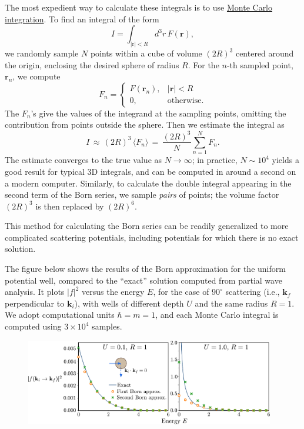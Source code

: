 \documentclass[pra,12pt]{revtex4}
\begin{document}
The most expedient way to calculate these integrals is to use
\href{https://en.wikipedia.org/wiki/Monte_Carlo_integration}{Monte
  Carlo integration}.  To find an integral of the form
\begin{equation}
  I = \int_{|\mathrm{r}|<R} d^3r \, F(\mathbf{r}),
\end{equation}
we randomly sample $N$ points within a cube of volume $(2R)^3$
centered around the origin, enclosing the desired sphere of radius
$R$.  For the $n$-th sampled point, $\mathbf{r}_n$, we compute
\begin{equation}
  F_n = \begin{cases}F(\mathbf{r}_n), & |\mathbf{r}| < R \\ 0, &\mathrm{otherwise}.\end{cases}
\end{equation}
The $F_n$'s give the values of the integrand at the sampling points,
omitting the contribution from points outside the sphere.  Then we
estimate the integral as
\begin{equation}
  I \,\approx\, (2R)^3 \, \langle F_n\rangle \,=\, \frac{(2R)^3}{N} \sum_{n=1}^N F_n.
\end{equation}
The estimate converges to the true value as $N\rightarrow\infty$; in
practice, $N \sim 10^4$ yields a good result for typical 3D integrals,
and can be computed in around a second on a modern computer.
Similarly, to calculate the double integral appearing in the second
term of the Born series, we sample \textit{pairs} of points; the
volume factor $(2R)^3$ is then replaced by $(2R)^6$.

This method for calculating the Born series can be readily generalized
to more complicated scattering potentials, including potentials for
which there is no exact solution.

The figure below shows the results of the Born approximation for the
uniform potential well, compared to the ``exact'' solution computed
from partial wave analysis.  It plots $|f|^2$ versus the energy $E$,
for the case of $90^\circ$ scattering (i.e., $\mathbf{k}_f$
perpendicular to $\mathbf{k}_i$), with wells of different depth $U$
and the same radius $R = 1$.  We adopt computational units $\hbar = m
= 1$, and each Monte Carlo integral is computed using $3\times10^4$
samples.

\begin{figure}[h]
  \centering\includegraphics[width=0.97\textwidth]{spherical_well_scattering}
\end{figure}
\end{document}
